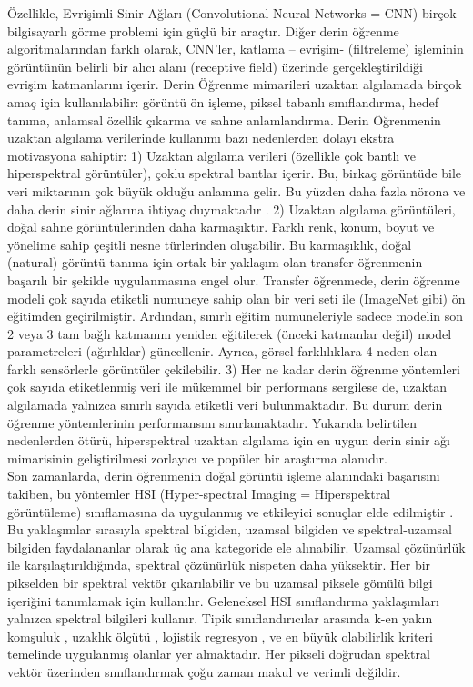 	Özellikle, Evrişimli Sinir Ağları (Convolutional Neural Networks = CNN) \cite{lecun1998gradient} birçok bilgisayarlı görme problemi için güçlü bir araçtır. Diğer derin öğrenme algoritmalarından farklı olarak, CNN'ler, katlama – evrişim- (filtreleme) işleminin görüntünün belirli bir alıcı alanı (receptive field) üzerinde gerçekleştirildiği evrişim katmanlarını içerir. Derin Öğrenme mimarileri uzaktan algılamada birçok amaç için kullanılabilir: görüntü ön işleme, piksel tabanlı sınıflandırma, hedef tanıma, anlamsal özellik çıkarma ve sahne anlamlandırma. Derin Öğrenmenin uzaktan algılama verilerinde kullanımı bazı nedenlerden dolayı ekstra motivasyona sahiptir: 1) Uzaktan algılama verileri (özellikle çok bantlı ve hiperspektral görüntüler), çoklu spektral bantlar içerir. Bu, birkaç görüntüde bile veri miktarının çok büyük olduğu anlamına gelir. Bu yüzden daha fazla nörona ve daha derin sinir ağlarına ihtiyaç duymaktadır \cite{chen2013aircraft}. 2) Uzaktan algılama görüntüleri, doğal sahne görüntülerinden daha karmaşıktır. Farklı renk, konum, boyut ve yönelime sahip çeşitli nesne türlerinden oluşabilir. Bu karmaşıklık, doğal (natural) görüntü tanıma için ortak bir yaklaşım olan transfer öğrenmenin başarılı bir şekilde uygulanmasına engel olur. Transfer öğrenmede, derin öğrenme modeli çok sayıda etiketli numuneye sahip olan bir veri seti ile (ImageNet gibi) ön eğitimden geçirilmiştir. Ardından, sınırlı eğitim numuneleriyle sadece modelin son 2 veya 3 tam bağlı katmanını yeniden eğitilerek (önceki katmanlar değil) model parametreleri (ağırlıklar) güncellenir. Ayrıca, görsel farklılıklara 4 neden olan farklı sensörlerle görüntüler çekilebilir. 3) Her ne kadar derin öğrenme yöntemleri çok sayıda etiketlenmiş veri ile mükemmel bir performans sergilese de, uzaktan algılamada yalnızca sınırlı sayıda etiketli veri bulunmaktadır. Bu durum derin öğrenme yöntemlerinin performansını sınırlamaktadır. Yukarıda belirtilen nedenlerden ötürü, hiperspektral uzaktan algılama için en uygun derin sinir ağı mimarisinin geliştirilmesi zorlayıcı ve popüler bir araştırma alanıdır.\\
	
	Son zamanlarda, derin öğrenmenin doğal görüntü işleme alanındaki başarısını takiben, bu yöntemler HSI (Hyper-spectral Imaging = Hiperspektral görüntüleme) sınıflamasına da uygulanmış ve etkileyici sonuçlar elde edilmiştir \cite{chen2016deep} \cite{chen2015spectral} \cite{samaniego2008supervised}. Bu yaklaşımlar sırasıyla spektral bilgiden, uzamsal bilgiden ve spektral-uzamsal bilgiden faydalananlar olarak üç ana kategoride ele alınabilir. Uzamsal çözünürlük ile karşılaştırıldığında, spektral çözünürlük nispeten daha yüksektir. Her bir pikselden bir spektral vektör çıkarılabilir ve bu uzamsal piksele gömülü bilgi içeriğini tanımlamak için kullanılır. Geleneksel HSI sınıflandırma yaklaşımları yalnızca spektral bilgileri kullanır. Tipik sınıflandırıcılar arasında k-en yakın komşuluk \cite{samaniego2008supervised}, uzaklık ölçütü \cite{du2001linear}, lojistik regresyon \cite{li2010semisupervised}, ve en büyük olabilirlik kriteri \cite{ediriwickrema1997hierarchical} temelinde uygulanmış olanlar yer almaktadır. Her pikseli doğrudan spektral vektör üzerinden sınıflandırmak çoğu zaman makul ve verimli değildir. \\
	
